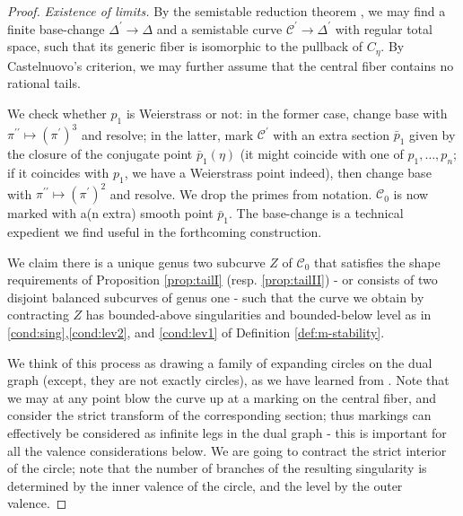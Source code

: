 \documentclass[11pt]{amsart}
\renewcommand{\to}{\rightarrow}
\newcommand{\dvr}{\Delta}
\theoremstyle{plain}
\theoremstyle{definition}
\begin{document}
\begin{proof}
 \emph{Existence of limits.}
  By the semistable reduction theorem \cite[Corollary 2.7]{DM}, we may find a finite base-change $\dvr^\prime\to\dvr$ and a semistable curve $\mathcal C^\prime\to\dvr^\prime$ with regular total space, such that its generic fiber is isomorphic to the pullback of $C_\eta$. By Castelnuovo's criterion, we may further assume that the central fiber contains no rational tails.
  
  We check whether $p_1$ is Weierstrass or not: in the former case, change base with $\pi^{\prime\prime}\mapsto(\pi^\prime)^3$ and resolve; in the latter, mark $\mathcal C^\prime$ with an extra section $\bar p_1$ given by the closure of the conjugate point $\bar p_1(\eta)$ (it might coincide with one of $p_1,\ldots,p_n$; if it coincides with $p_1$, we have a Weierstrass point indeed), then change base with $\pi^{\prime\prime}\mapsto(\pi^\prime)^2$ and resolve. We drop the primes from notation. $\mathcal C_0$ is now marked with a(n extra) smooth point $\bar p_1$. The base-change is a technical expedient we find useful in the forthcoming construction.
  
  We claim there is a unique genus two subcurve $Z$ of $\mathcal C_0$ that satisfies the shape requirements of Proposition \ref{prop:tailI} (resp. \ref{prop:tailII}) - or consists of two disjoint balanced subcurves of genus one - such that the curve we obtain by contracting $Z$ has bounded-above singularities and bounded-below level as in \eqref{cond:sing},\eqref{cond:lev2}, and \eqref{cond:lev1} of Definition \ref{def:m-stability}.
  
  We think of this process as drawing a family of expanding circles on the dual graph (except, they are not exactly circles), as we have learned from \cite{RSPW1}. Note that we may at any point blow the curve up at a marking on the central fiber, and consider the strict transform of the corresponding section; thus markings can effectively be considered as infinite legs in the dual graph - this is important for all the valence considerations below. We are going to contract the strict interior of the circle; note that the number of branches of the resulting singularity is determined by the inner valence of the circle, and the level by the outer valence.
  

\end{proof}
\end{document}
